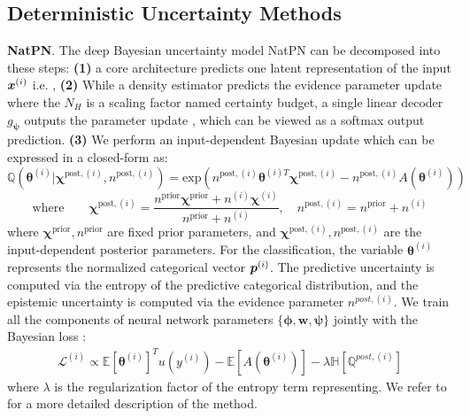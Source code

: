 \subsection{Deterministic Uncertainty Methods}
\label{appendix:dums}

\textbf{NatPN}. The deep Bayesian uncertainty model NatPN \citep{charpentier2022natpn} can be decomposed into these steps: 
\textbf{(1)} a core architecture predicts one latent representation of the input $\bm{x}^{(i)}$ i.e. , 
\textbf{(2)} While a density estimator  predicts the evidence parameter update  where the $N_H$ is a scaling factor named certainty budget, a single linear decoder $g_{\bm{\psi}}$ outputs the parameter update , which can be viewed as a softmax output prediction.
\textbf{(3)} We perform an input-dependent Bayesian update which can be expressed in a closed-form as:
$$\mathbb{Q}(\boldsymbol{\theta}^{(i)}|\boldsymbol{\chi}^{\text{post},(i)}, n^{\text{post},(i)}) = \text{exp}(n^{\text{post},(i)}\boldsymbol{\theta}^{(i) T}\boldsymbol{\chi}^{\text{post},(i)}-n^{\text{post},(i)}A(\boldsymbol{\theta}^{(i)}))$$
$$\text{where} \qquad \boldsymbol{\chi}^{\text{post},(i)}=\frac{n^{\text{prior}}\boldsymbol{\chi}^{\text{prior}}+n^{(i)}\boldsymbol{\chi}^{(i)}}{n^{\text{prior}}+n^{(i)}}, \quad n^{\text{post},(i)}=n^\text{prior}+n^{(i)}$$
where $\boldsymbol{\chi}^\text{prior}, n^\text{prior}$ are fixed prior parameters, and  $\boldsymbol{\chi}^{\text{post}, (i)}, n^{\text{post}, (i)}$ are the input-dependent posterior parameters.
For the classification, the variable $\boldsymbol{\theta}^{(i)}$ represents the normalized categorical vector $\bm{p}^{(i)}$. The predictive uncertainty is computed via the entropy of the predictive categorical distribution, and the epistemic uncertainty is computed via the evidence parameter $n^{post,(i)}$. We train all the components of neural network parameters $\{\bm{\phi}, \bm{w}, \bm{\psi}\}$ jointly with the Bayesian loss \citep{charpentier2022natpn}:
\begin{equation}
    \begin{split}
        \mathcal{L}^{(i)} \propto \mathbb{E}[\boldsymbol{\theta}^{(i)}]^T u(y^{(i)})-\mathbb{E}[A(\boldsymbol{\theta}^{(i)})]- \lambda\mathbb{H}[\mathbb{Q}^{post,(i)}] 
    \end{split}
\end{equation}
where $\lambda$ is the regularization factor of the entropy term representing. We refer to \citep{charpentier2022natpn} for a more detailed description of the method.

